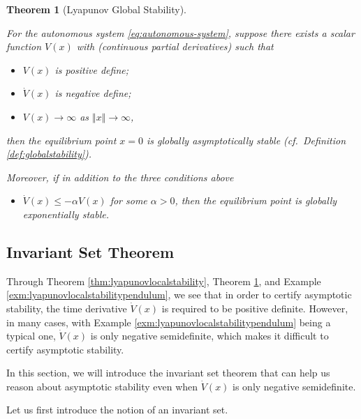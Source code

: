 \documentclass[
]{book}
\providecommand{\tightlist}{%
  \setlength{\itemsep}{0pt}\setlength{\parskip}{0pt}}
\newtheorem{theorem}{Theorem}[chapter]
\theoremstyle{definition}
\theoremstyle{definition}
\theoremstyle{definition}
\theoremstyle{definition}
\theoremstyle{remark}
\begin{document}
\begin{theorem}[Lyapunov Global Stability]
\protect\hypertarget{thm:lyapunovglobalstability}{}\label{thm:lyapunovglobalstability}

For the autonomous system \eqref{eq:autonomous-system}, suppose there exists a scalar function \(V(x)\) with (continuous partial derivatives) such that

\begin{itemize}
\item
  \(V(x)\) is positive define;
\item
  \(\dot{V}(x)\) is negative define;
\item
  \(V(x) \rightarrow \infty\) as \(\Vert x \Vert \rightarrow \infty\),
\end{itemize}

then the equilibrium point \(x = 0\) is globally asymptotically stable (cf.~Definition \ref{def:globalstability}).

Moreover, if in addition to the three conditions above

\begin{itemize}
\tightlist
\item
  \(\dot{V}(x) \leq - \alpha V(x)\) for some \(\alpha > 0\), then the equilibrium point is globally exponentially stable.
\end{itemize}

\end{theorem}

\hypertarget{invariant-set-theorem}{%
\subsection{Invariant Set Theorem}\label{invariant-set-theorem}}

Through Theorem \ref{thm:lyapunovlocalstability}, Theorem \ref{thm:lyapunovglobalstability}, and Example \ref{exm:lyapunovlocalstabilitypendulum}, we see that in order to certify asymptotic stability, the time derivative \(\dot{V}(x)\) is required to be positive definite. However, in many cases, with Example \ref{exm:lyapunovlocalstabilitypendulum} being a typical one, \(\dot{V}(x)\) is only negative semidefinite, which makes it difficult to certify asymptotic stability.

In this section, we will introduce the invariant set theorem that can help us reason about asymptotic stability even when \(\dot{V}(x)\) is only negative semidefinite.

Let us first introduce the notion of an invariant set.
\end{document}

